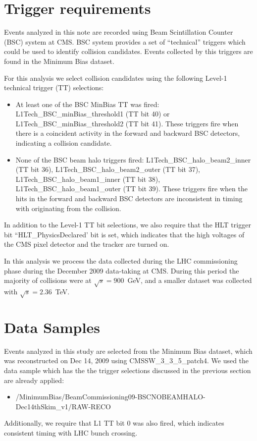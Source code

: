\section{Trigger requirements}
Events analyzed in this note are recorded using Beam Scintillation
Counter (BSC) system at CMS. BSC system provides a set of ``technical'' triggers which
could be used to identify collision candidates. Events collected by this
triggers are found in the Minimum Bias dataset. 

For this analysis we select collision candidates using the following
Level-1 technical trigger (TT) selections:

\begin{itemize}
\item At least one of the BSC MinBias TT was fired:
  L1Tech\_BSC\_minBias\_threshold1 (TT bit 40) or
  L1Tech\_BSC\_minBias\_threshold2 (TT bit 41). These triggers fire when
  there is a coincident activity in the forward and backward BSC
  detectors, indicating a collision candidate.
\item None of the BSC beam halo triggers fired:
  L1Tech\_BSC\_halo\_beam2\_inner (TT bit 36),
  L1Tech\_BSC\_halo\_beam2\_outer (TT bit 37),
  L1Tech\_BSC\_halo\_beam1\_inner (TT bit 38),
  L1Tech\_BSC\_halo\_beam1\_outer (TT bit 39). These triggers fire when
  the hits in the forward and backward BSC detectors are inconsistent in
  timing with originating from the collision.
\end{itemize}

In addition to the Level-1 TT bit selections, we also require that the
HLT trigger bit ``HLT\_PhysicsDeclared' bit is set, which indicates that
the high voltages of the CMS pixel detector and the tracker are turned
on.

In this analysis we process the data collected during the LHC
commissioning phase during the December 2009 data-taking at CMS. During
this period the majority of collisions were at $\sqrt{s}=900$~GeV, and a
smaller dataset was collected with $\sqrt{s}=2.36$~TeV.

\section{Data Samples}

Events analyzed in this study are selected from the Minimum Bias
dataset, which was reconstructed on Dec 14, 2009 using
CMSSW\_3\_3\_5\_patch4. We used the data sample which has the the
trigger selections discussed in the previous section are already
applied:
\begin{itemize}
\item
  /MinimumBias/BeamCommissioning09-BSCNOBEAMHALO-Dec14thSkim\_v1/RAW-RECO
\end{itemize}
Additionally, we require that L1 TT bit 0 was also fired, which
indicates consistent timing with LHC bunch crossing.

